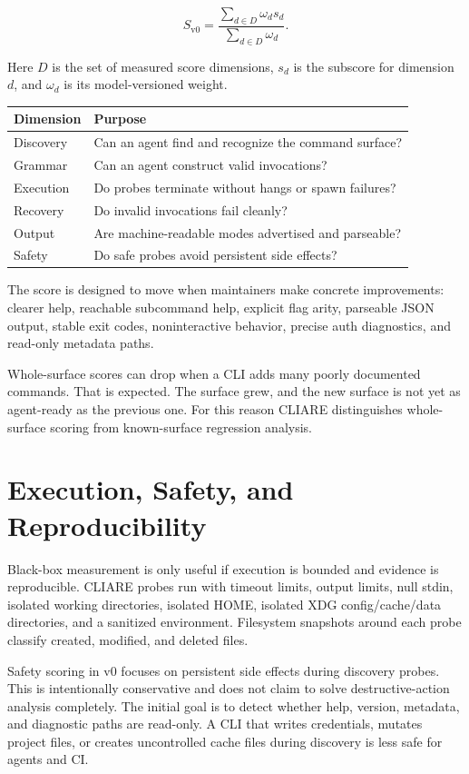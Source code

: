 \documentclass[11pt]{article}
\begin{document}
\[
S_{\mathrm{v0}}
  =
  \frac{\sum_{d \in D} \omega_d s_d}
       {\sum_{d \in D} \omega_d}.
\]

Here \(D\) is the set of measured score dimensions, \(s_d\) is the subscore for dimension \(d\), and \(\omega_d\) is its model-versioned weight.

\begin{table}[h]
\centering
\begin{tabularx}{\textwidth}{@{}lX@{}}
\toprule
Dimension & Purpose \\
\midrule
Discovery & Can an agent find and recognize the command surface? \\
Grammar & Can an agent construct valid invocations? \\
Execution & Do probes terminate without hangs or spawn failures? \\
Recovery & Do invalid invocations fail cleanly? \\
Output & Are machine-readable modes advertised and parseable? \\
Safety & Do safe probes avoid persistent side effects? \\
\bottomrule
\end{tabularx}
\end{table}

The score is designed to move when maintainers make concrete improvements: clearer help, reachable subcommand help, explicit flag arity, parseable JSON output, stable exit codes, noninteractive behavior, precise auth diagnostics, and read-only metadata paths.

Whole-surface scores can drop when a CLI adds many poorly documented commands. That is expected. The surface grew, and the new surface is not yet as agent-ready as the previous one. For this reason CLIARE distinguishes whole-surface scoring from known-surface regression analysis.

\section{Execution, Safety, and Reproducibility}

Black-box measurement is only useful if execution is bounded and evidence is reproducible. CLIARE probes run with timeout limits, output limits, null stdin, isolated working directories, isolated HOME, isolated XDG config/cache/data directories, and a sanitized environment. Filesystem snapshots around each probe classify created, modified, and deleted files.

Safety scoring in v0 focuses on persistent side effects during discovery probes. This is intentionally conservative and does not claim to solve destructive-action analysis completely. The initial goal is to detect whether help, version, metadata, and diagnostic paths are read-only. A CLI that writes credentials, mutates project files, or creates uncontrolled cache files during discovery is less safe for agents and CI.
\end{document}
